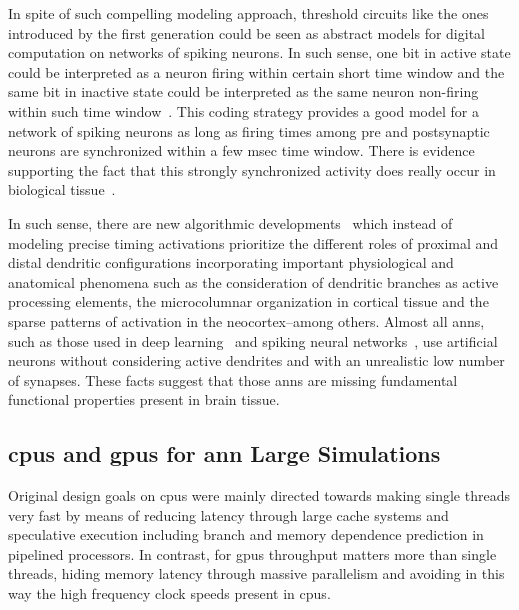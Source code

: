 \documentclass[10pt,journal,compsoc]{IEEEtran}
\begin{document}
In spite of such compelling modeling approach, threshold circuits like the ones introduced by the first generation could be seen as abstract models for digital computation on networks of spiking neurons. In such sense, one bit in active state could be interpreted as a neuron firing within certain short time window and the same bit in inactive state could be interpreted as the same neuron non-firing within such time window~\cite{Valiant:1994:CM:199266}. This coding strategy provides a good model for a network of spiking neurons as long as firing times among pre and postsynaptic neurons are synchronized within a few msec time window. There is evidence supporting the fact that this strongly synchronized activity does really occur in biological tissue~\cite{Abeles1993SpatiotemporalFP,bair1994}.

In such sense, there are new algorithmic developments~\cite{10.3389/fncir.2016.00023,Dematties2018} which instead of modeling precise timing activations prioritize the different roles of proximal and distal dendritic configurations incorporating important physiological and anatomical phenomena such as the consideration of dendritic branches as active processing elements, the microcolumnar organization in cortical tissue and the sparse patterns of activation in the neocortex--among others. Almost all \glspl{ann}, such as those used in deep learning~\cite{lecun_deep_2015} and spiking neural networks~\cite{MAASS19971659}, use artificial neurons without considering active dendrites and with an unrealistic low number of synapses. These facts suggest that those \glspl{ann} are missing fundamental functional properties present in brain tissue. 
















\subsection{\glspl{cpu} and \glspl{gpu} for \gls{ann} Large Simulations}

Original design goals on \glspl{cpu} were mainly directed towards making single threads very fast by means of reducing latency through large cache systems and speculative execution including branch and memory dependence prediction in pipelined processors. In contrast, for \glspl{gpu} throughput matters more than single threads, hiding memory latency through massive parallelism and avoiding in this way the high frequency clock speeds present in \glspl{cpu}.
\end{document}
